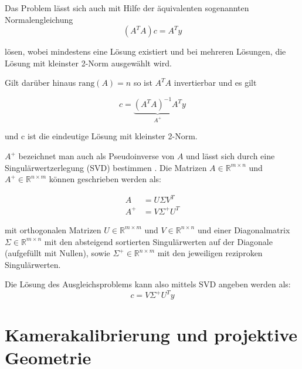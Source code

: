 Das Problem lässt sich auch mit Hilfe der äquivalenten sogenannten Normalengleichung
\begin{equation*}
	(A^TA)c = A^Ty
\end{equation*}

lösen, wobei mindestens eine Lösung existiert und bei mehreren Lösungen, die Lösung mit kleinster 2-Norm ausgewählt wird. 

Gilt darüber hinaus $\text{rang}\left(A\right) = n$ so ist $A^TA$ invertierbar und es gilt 

\begin{equation}\label{eq:normaleq}
c = \underbrace{(A^TA)^{-1}A^T}_{A^+}y
\end{equation}

und c ist die eindeutige Lösung mit kleinster 2-Norm.

$A^+$ bezeichnet man auch als Pseudoinverse von $A$ und lässt sich durch eine Singulärwertzerlegung (SVD) bestimmen \cite{Stoer2011}. Die Matrizen $A\in\mathbb{R}^{m\times n}$ und $A^+\in\mathbb{R}^{n\times m}$ können geschrieben werden als:

\[
\begin{aligned}
A &= U\Sigma V^T \\
A^+ &= V\Sigma^+U^T
\end{aligned}
\]

mit orthogonalen Matrizen $U\in\mathbb{R}^{m\times m}$ und $V\in\mathbb{R}^{n\times n}$ und einer Diagonalmatrix $\Sigma\in\mathbb{R}^{m\times n}$ mit den absteigend sortierten Singulärwerten auf der Diagonale (aufgefüllt mit Nullen), sowie $\Sigma^+\in\mathbb{R}^{n\times m}$ mit den jeweiligen reziproken Singulärwerten.


Die Lösung des Ausgleichsproblems kann also mittels SVD angeben werden als:
\[
c = V\Sigma^+U^Ty
\]



\section{Kamerakalibrierung und projektive Geometrie}
\label{s:calib}

